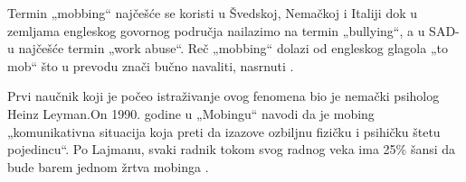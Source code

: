 \documentclass[a4paper]{article}
\newcommand{\quotes}[1]{„#1“}
\begin{document}
        Termin \quotes{mobbing} najčešće se koristi u Švedskoj, Nemačkoj i Italiji dok u zemljama engleskog govornog područja nailazimo na termin \quotes{bullying}, a u SAD-u najčešće termin \quotes{work abuse}. Reč \quotes{mobbing} dolazi od engleskog glagola \quotes{to mob} što u prevodu znači bučno navaliti, nasrnuti \cite{stajemobing}.
        
        Prvi naučnik koji je počeo istraživanje ovog fenomena bio je nemački psiholog Heinz Leyman.\hspace{0.1cm}On 1990. godine u \quotes{Mobingu} navodi da je mobing \quotes{komunikativna situacija koja preti da izazove ozbiljnu fizičku i psihičku štetu pojedincu}. Po Lajmanu, svaki radnik tokom svog radnog veka ima 25\% šansi da bude barem jednom žrtva mobinga \cite{leymannmobbing}.
        
\end{document}
